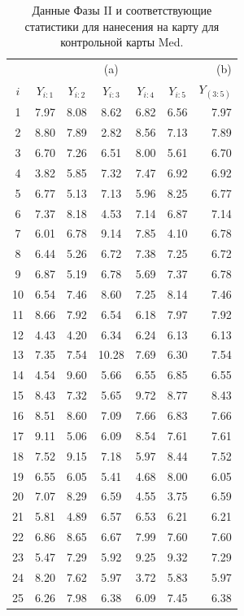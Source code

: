 \begin{table}[!ht]
	\centering
	\caption{Данные Фазы II и соответствующие статистики для нанесения на карту для контрольной карты Med.}
	\label{tab:4.22}
	\small
	\begin{tabular}{@{}ccccccr@{}}
		\toprule
		& \multicolumn{5}{c}{(a)} & (b) \\
		\(i\) & \(Y_{i:1}\) & \(Y_{i:2}\) & \(Y_{i:3}\) & \(Y_{i:4}\) & \(Y_{i:5}\) & \(Y_{(3:5)}\) \\
		\midrule
		1 & 7.97 & 8.08 & 8.62 & 6.82 & 6.56 & 7.97 \\
		2 & 8.80 & 7.89 & 2.82 & 8.56 & 7.13 & 7.89 \\
		3 & 6.70 & 7.26 & 6.51 & 8.00 & 5.61 & 6.70 \\
		4 & 3.82 & 5.85 & 7.32 & 7.47 & 6.92 & 6.92 \\
		5 & 6.77 & 5.13 & 7.13 & 5.96 & 8.25 & 6.77 \\
		6 & 7.37 & 8.18 & 4.53 & 7.14 & 6.87 & 7.14 \\
		7 & 6.01 & 6.78 & 9.14 & 7.85 & 4.10 & 6.78 \\
		8 & 6.44 & 5.26 & 6.72 & 7.38 & 7.25 & 6.72 \\
		9 & 6.87 & 5.19 & 6.78 & 5.69 & 7.37 & 6.78 \\
		10 & 6.54 & 7.46 & 8.60 & 7.25 & 8.14 & 7.46 \\
		11 & 8.66 & 7.92 & 6.54 & 6.18 & 7.97 & 7.92 \\
		12 & 4.43 & 4.20 & 6.34 & 6.24 & 6.13 & 6.13 \\
		13 & 7.35 & 7.54 & 10.28 & 7.69 & 6.30 & 7.54 \\
		14 & 4.54 & 9.60 & 5.66 & 6.55 & 6.85 & 6.55 \\
		15 & 8.43 & 7.32 & 5.65 & 9.72 & 8.77 & 8.43 \\
		16 & 8.51 & 8.60 & 7.09 & 7.66 & 6.83 & 7.66 \\
		17 & 9.11 & 5.06 & 6.09 & 8.54 & 7.61 & 7.61 \\
		18 & 7.52 & 9.15 & 7.18 & 5.97 & 8.44 & 7.52 \\
		19 & 6.55 & 6.05 & 5.41 & 4.68 & 8.00 & 6.05 \\
		20 & 7.07 & 8.29 & 6.59 & 4.55 & 3.75 & 6.59 \\
		21 & 5.81 & 4.89 & 6.57 & 6.53 & 6.21 & 6.21 \\
		22 & 6.86 & 8.65 & 6.67 & 7.99 & 7.60 & 7.60 \\
		23 & 5.47 & 7.29 & 5.92 & 9.25 & 9.32 & 7.29 \\
		24 & 8.20 & 7.62 & 5.97 & 3.72 & 5.83 & 5.97 \\
		25 & 6.26 & 7.98 & 6.38 & 6.09 & 7.45 & 6.38 \\
		\bottomrule
	\end{tabular}
\end{table}

